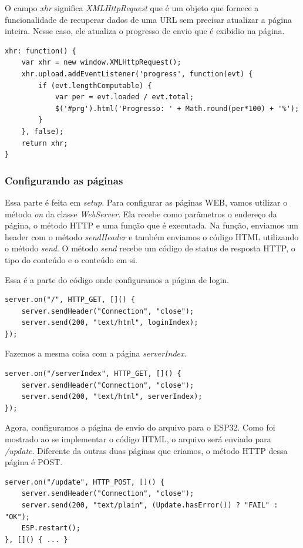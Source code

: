 \documentclass[12pt]{article}
\begin{document}
O campo \textit{xhr} significa \textit{XMLHttpRequest} que é um objeto que fornece a funcionalidade de recuperar dados de uma URL sem precisar atualizar a página inteira. Nesse caso, ele atualiza o progresso de envio que é exibidio na página.

\begin{lstlisting}
xhr: function() {
    var xhr = new window.XMLHttpRequest();
    xhr.upload.addEventListener('progress', function(evt) {
        if (evt.lengthComputable) {
            var per = evt.loaded / evt.total;
            $('#prg').html('Progresso: ' + Math.round(per*100) + '%');
        }
    }, false);
    return xhr;
}
\end{lstlisting}

\subsubsection{Configurando as páginas}

Essa parte é feita em \textit{setup}. Para configurar as páginas WEB, vamos utilizar o método \textit{on} da classe \textit{WebServer}. Ela recebe como parâmetros o endereço da página, o método HTTP e uma função que é executada. Na função, enviamos um header com o método \textit{sendHeader} e também enviamos o código HTML utilizando o método \textit{send}. O método \textit{send} recebe um código de status de resposta HTTP, o tipo do conteúdo e o conteúdo em si.

Essa é a parte do código onde configuramos a página de login.
\begin{lstlisting}
server.on("/", HTTP_GET, []() {
    server.sendHeader("Connection", "close");
    server.send(200, "text/html", loginIndex);
});
\end{lstlisting}

Fazemos a mesma coisa com a página \textit{serverIndex}.

\begin{lstlisting}
server.on("/serverIndex", HTTP_GET, []() {
    server.sendHeader("Connection", "close");
    server.send(200, "text/html", serverIndex);
});
\end{lstlisting}

Agora, configuramos a página de envio do arquivo para o ESP32. Como foi mostrado ao se implementar o código HTML, o arquivo será enviado para \textit{/update}. Diferente da outras duas páginas que criamos, o método HTTP dessa página é POST.

\begin{lstlisting}
server.on("/update", HTTP_POST, []() {
    server.sendHeader("Connection", "close");
    server.send(200, "text/plain", (Update.hasError()) ? "FAIL" : "OK");
    ESP.restart();
}, []() { ... }
\end{lstlisting}
\end{document}
